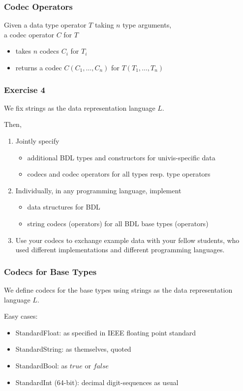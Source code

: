 \begin{frame}\frametitle{Codec Operators}
Given a data type operator $T$ taking $n$ type arguments,\\
a codec operator $C$ for $T$
\begin{itemize}
 \item takes $n$ codecs $C_i$ for $T_i$
 \item returns a codec $C(C_1,\ldots,C_n)$ for $T(T_1,\ldots,T_n)$
\end{itemize}
\end{frame}

\begin{frame}\frametitle{Exercise 4}
We fix strings as the data representation language $L$.

Then, 
\begin{enumerate}
 \item Jointly specify
  \begin{itemize}
  \item additional BDL types and constructors for univis-specific data
  \item codecs and codec operators for all types resp. type operators
  \end{itemize}
 \item Individually, in any programming language, implement
  \begin{itemize}
   \item data structures for BDL
   \item string codecs (operators) for all BDL base types (operators)
  \end{itemize}
 \item Use your codecs to exchange example data with your fellow students, who used different implementations and different programming languages.
\end{enumerate}
\end{frame}

\begin{frame}\frametitle{Codecs for Base Types}
We define codecs for the base types using strings as the data representation language $L$.

Easy cases:
\begin{itemize}
\item StandardFloat: as specified in IEEE floating point standard
\item StandardString: as themselves, quoted
\item StandardBool: as $true$ or $false$
\item StandardInt (64-bit): decimal digit-sequences as usual
\end{itemize}
\end{frame}

